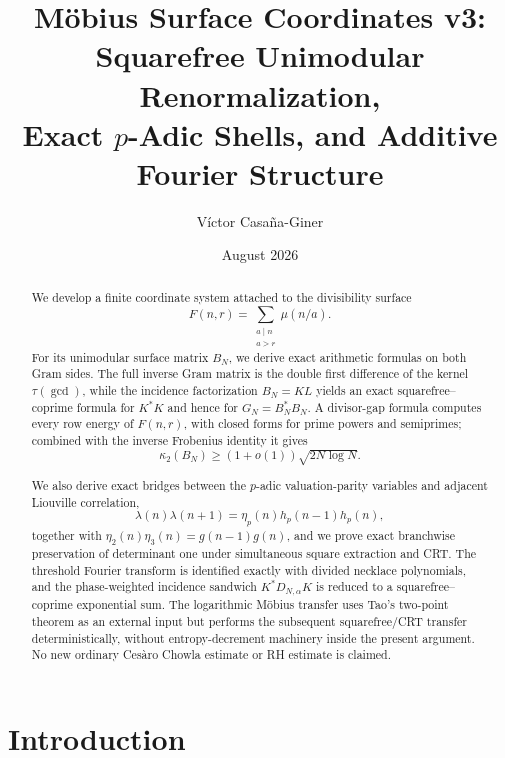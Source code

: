 \documentclass[11pt]{amsart}
\title{Möbius Surface Coordinates v3: Squarefree Unimodular Renormalization,\\Exact $p$-Adic Shells, and Additive Fourier Structure}
\author{Víctor Casaña-Giner}
\date{August 2026}
\numberwithin{equation}{section}
\theoremstyle{plain}
\theoremstyle{definition}
\theoremstyle{remark}
\newcommand{\mob}{\mu}
\newcommand{\liou}{\lambda}
\newcommand{\Fsurf}{F}
\begin{document}
\pagestyle{plain}

\begin{abstract}
We develop a finite coordinate system attached to the divisibility surface
\begin{equation}
\Fsurf(n,r)=\sum_{\substack{a\mid n\\a>r}}\mob(n/a).
\label{eq:abstract_surface}
\end{equation}
For its unimodular surface matrix $B_N$, we derive exact arithmetic formulas on both Gram sides.  The full inverse Gram matrix is the double first difference of the kernel $\tau(\gcd)$, while the incidence factorization $B_N=KL$ yields an exact squarefree--coprime formula for $K^*K$ and hence for $G_N=B_N^*B_N$.  A divisor-gap formula computes every row energy of $F(n,r)$, with closed forms for prime powers and semiprimes; combined with the inverse Frobenius identity it gives
\begin{equation}
\kappa_2(B_N)\ge (1+o(1))\sqrt{2N\log N}.
\label{eq:abstract_condition_number}
\end{equation}

We also derive exact bridges between the $p$-adic valuation-parity variables and adjacent Liouville correlation,
\begin{equation}
\liou(n)\liou(n+1)=\eta_p(n)h_p(n-1)h_p(n),
\label{eq:abstract_eta_lambda_bridge}
\end{equation}
together with $\eta_2(n)\eta_3(n)=g(n-1)g(n)$, and we prove exact branchwise preservation of determinant one under simultaneous square extraction and CRT.  The threshold Fourier transform is identified exactly with divided necklace polynomials, and the phase-weighted incidence sandwich $K^*D_{N,\alpha}K$ is reduced to a squarefree--coprime exponential sum.  The logarithmic Möbius transfer uses Tao's two-point theorem as an external input but performs the subsequent squarefree/CRT transfer deterministically, without entropy-decrement machinery inside the present argument.  No new ordinary Cesàro Chowla estimate or RH estimate is claimed.
\end{abstract}

\maketitle
\tableofcontents
\bigskip

\section{Introduction}
\label{sec:introduction}
\end{document}
